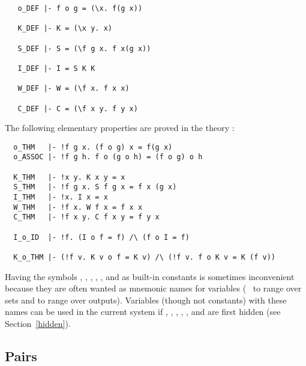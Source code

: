 \begin{hol}
{\small
\begin{verbatim}
   o_DEF |- f o g = (\x. f(g x))

   K_DEF |- K = (\x y. x)

   S_DEF |- S = (\f g x. f x(g x))

   I_DEF |- I = S K K

   W_DEF |- W = (\f x. f x x)

   C_DEF |- C = (\f x y. f y x)
\end{verbatim}}
\end{hol}

\noindent The following elementary properties are proved in the theory
:

\begin{hol}
\begin{verbatim}
  o_THM   |- !f g x. (f o g) x = f(g x)
  o_ASSOC |- !f g h. f o (g o h) = (f o g) o h

  K_THM   |- !x y. K x y = x
  S_THM   |- !f g x. S f g x = f x (g x)
  I_THM   |- !x. I x = x
  W_THM   |- !f x. W f x = f x x
  C_THM   |- !f x y. C f x y = f y x

  I_o_ID  |- !f. (I o f = f) /\ (f o I = f)

  K_o_THM |- (!f v. K v o f = K v) /\ (!f v. f o K v = K (f v))
\end{verbatim}
\end{hol}

Having the symbols , , , , , and 
as built-in constants
is sometimes inconvenient because they are often wanted
as mnemonic names for variables (\eg\  to range over sets and
 to range over outputs).  Variables (though not constants) with
these names can be used in the current system if , , ,
, , and  are first hidden (see Section~\ref{hidden}).


\subsection{Pairs}\label{prod}


